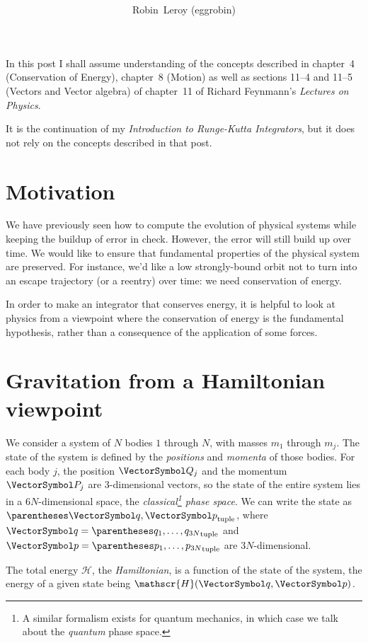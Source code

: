 \documentclass[10pt, a4paper, twoside]{basestyle}
\title{%
\textdisplay{%
A Short Introduction Hamiltonian Mechanics}%
}
\author{Robin~Leroy (eggrobin)}
\begin{document}
\maketitle
In this post I shall assume understanding of the concepts described in
chapter~4 (Conservation of Energy), chapter~8 (Motion) as well as sections
11--4 and 11--5 (Vectors and Vector algebra) of chapter~11 of Richard
Feynmann's \emph{Lectures on Physics}.

It is the continuation of my \emph{Introduction to Runge-Kutta Integrators},
but it does not rely on the concepts described in that post.

\section{Motivation}
We have previously seen how to compute the evolution of physical systems while
keeping the buildup of error in check. However, the error will still build up
over time. We would like to ensure that fundamental properties of the physical
system are preserved. For instance, we'd like a low strongly-bound orbit not to
turn into an escape trajectory (or a reentry) over time: we need conservation
of energy.

In order to make an integrator that conserves energy, it is helpful to look at
physics from a viewpoint where the conservation of energy is the fundamental
hypothesis, rather than a consequence of the application of some forces.

\newcommand{\Hamiltonian}{\mathscr{H}}
\section{Gravitation from a Hamiltonian viewpoint}
We consider a system of $N$ bodies $1$ through $N$, with masses $m_1$ through
$m_j$. The state of the system is defined by the \emph{positions} and
\emph{momenta} of those bodies. For each body $j$, the position $\vQ_j$ and the
momentum $\vP_j$ are 3-dimensional vectors, so the state of the entire system
lies in a $6N$-dimensional space, the \emph{classical\footnote{A similar
formalism exists for quantum mechanics, in which case we talk about the
\emph{quantum} phase space.} phase space}.
We can write the state as $\tuple{\vq, \vp}$, where $\vq = \tuple{q_1, \dotsc,
q_{3N}}$ and $\vp =  \tuple{p_1, \dotsc, p_{3N}}$ are $3N$-dimensional.

The total energy $\Hamiltonian$, the \emph{Hamiltonian}, is a function
of the state of the system, the energy of a given state being $\Hamiltonian(\vq,
\vp)$.
\end{document}
